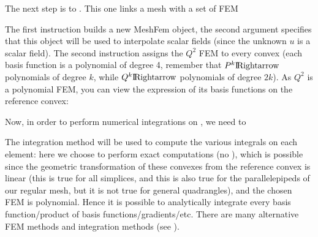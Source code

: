 \documentclass[a4paper,11pt,english]{sphinxmanual}
\begin{document}
The next step is to . This one links a mesh with a set
of FEM

\begin{sphinxVerbatim}[commandchars=\\\{\},numbers=left,firstnumber=1,stepnumber=1]

   
\end{sphinxVerbatim}

The first instruction builds a new MeshFem object, the second argument specifies
that this object will be used to interpolate scalar fields (since the unknown
\(u\) is a scalar field). The second instruction assigns the \(Q^2\) FEM
to every convex (each basis function is a polynomial of degree 4, remember that
\(P^k\rm I\hspace{-0.15em}Rightarrow\) polynomials of degree \(k\), while
\(Q^k\rm I\hspace{-0.15em}Rightarrow\) polynomials of degree \(2k\)). As \(Q^2\) is a
polynomial FEM, you can view the expression of its basis functions on the
reference convex:

\begin{sphinxVerbatim}[commandchars=\\\{\},numbers=left,firstnumber=1,stepnumber=1]

\end{sphinxVerbatim}

Now, in order to perform numerical integrations on , we need to 

\begin{sphinxVerbatim}[commandchars=\\\{\},numbers=left,firstnumber=1,stepnumber=1]

\end{sphinxVerbatim}

The integration method will be used to compute the various integrals on each
element: here we choose to perform exact computations (no ), which is possible since the geometric transformation of these convexes
from the reference convex is linear (this is true for all simplices, and this is
also true for the parallelepipeds of our regular mesh, but it is not true for
general quadrangles), and the chosen FEM is polynomial. Hence it is possible to
analytically integrate every basis function/product of basis
functions/gradients/etc. There are many alternative FEM methods and integration
methods (see ).
\end{document}
